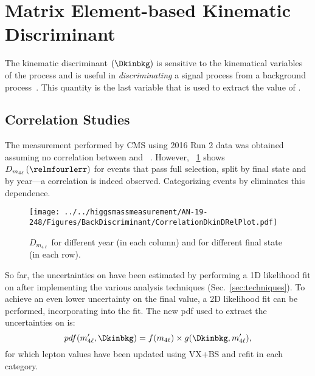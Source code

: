 \section{Matrix Element-based Kinematic Discriminant}
\label{sec:Dkin}
The kinematic discriminant $\left( \Dkinbkg \right)$ is sensitive to the kinematical variables of the \qqggzzfourl process and is useful in \emph{discriminating} a signal process from a background process~\cite{HIG_19_001}.
This quantity is the last variable that is used to extract the value of \mH.


\subsection{Correlation Studies}
\label{sec:DkinCorrelation}
The \mH measurement performed by CMS using 2016 Run 2 data was obtained assuming no correlation between \relmfourlerrflat and \Dkinbkg~\cite{HIG_16_041}.
However, \figurename~\ref{Dkin_sigma_correlation} shows $D_{m_{4\ell}} \left( \relmfourlerr \right)$ \vs \Dkinbkg for events that pass full selection, split by final state and by year---a correlation is indeed observed.
Categorizing events by \relmfourlerrflat eliminates this dependence.
\begin{figure}[!htbp]
\begin{center}
	\texttt{[image: ../../higgsmassmeasurement/AN-19-248/Figures/BackDiscriminant/CorrelationDkinDRelPlot.pdf]}
\caption{$D_{m_{4\ell}}$ \vs \Dkinbkg for different year (in each column) and for different final state (in each row).}
\label{Dkin_sigma_correlation}
\end{center}
\end{figure}

So far, the uncertainties on \mH have been estimated by performing a 1D likelihood fit on \mfourl after implementing the various analysis techniques (Sec.~\ref{sec:techniques}).
To achieve an even lower uncertainty on the final \mH value, a 2D likelihood fit can be performed, incorporating \Dkinbkg into the fit.
The new pdf used to extract the uncertainties on \mH is:
\[
pdf(m'_{4\ell}, \Dkinbkg) = f(m_{4\ell}) \times g(\Dkinbkg, m'_{4\ell}),
\]
for which lepton \pt values have been updated using VX+BS and \Zone refit in each category.


